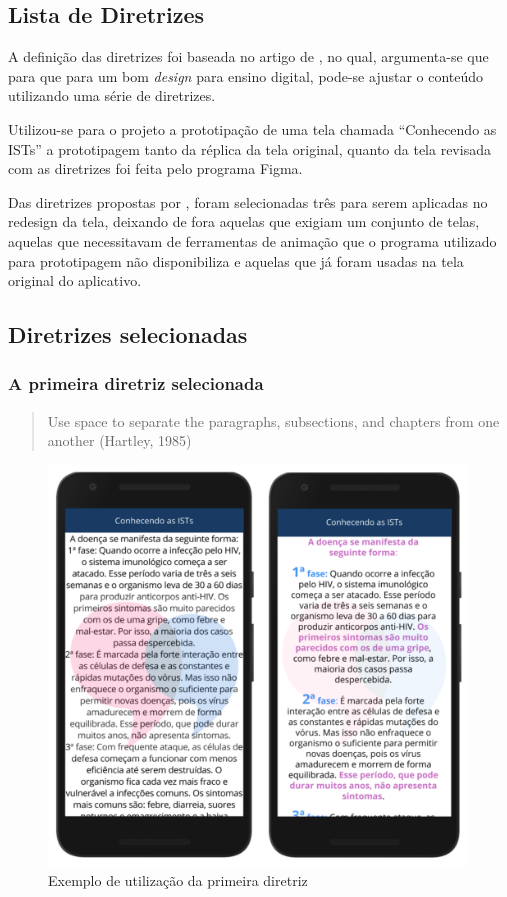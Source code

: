 \documentclass[12pt]{article}
\begin{document}
\subsection{Lista de Diretrizes}

A definição das diretrizes foi baseada no artigo de \cite{JIN2013248}, no qual, argumenta-se que para que para um bom \textit{design} para ensino digital, pode-se ajustar o conteúdo utilizando uma série de diretrizes.

Utilizou-se para o projeto a prototipação de uma tela chamada ``Conhecendo as ISTs'' a prototipagem tanto da réplica da tela original, quanto da tela revisada com as diretrizes foi feita pelo programa Figma.

Das diretrizes propostas por \cite{JIN2013248}, foram selecionadas três para serem aplicadas no redesign da tela, deixando de fora aquelas que exigiam um conjunto de telas, aquelas que necessitavam de ferramentas de animação que o programa utilizado para prototipagem não disponibiliza e aquelas que já foram usadas na tela original do aplicativo.

\subsection{Diretrizes selecionadas}

\subsubsection{A primeira diretriz selecionada}

\begin{quote}
	Use space to separate the paragraphs, subsections, and chapters from one another (Hartley, 1985)
\end{quote}

\begin{figure}[H]
  \centering
  \includegraphics[width=30em]{images/image_1.png}
  \caption{Exemplo de utilização da primeira diretriz}
  \label{fig:img1}
\end{figure}
\end{document}
